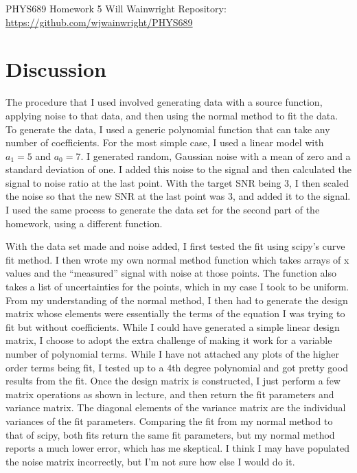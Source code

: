 \documentclass[twocolumn,11pt]{article}
\begin{document}
\pagestyle{plain}
\onecolumn
PHYS689 
\newline Homework 5
\newline Will Wainwright
\newline Repository: \href{https://github.com/wjwainwright/PHYS689}{https://github.com/wjwainwright/PHYS689}

\section*{Discussion}
The procedure that I used involved generating data with a source function, applying noise to that data, and then using the normal method to fit the data. To generate the data, I used a generic polynomial function that can take any number of coefficients. For the most simple case, I used a linear model with $a_1=5$ and $a_0=7$. I generated random, Gaussian noise with a mean of zero and a standard deviation of one. I added this noise to the signal and then calculated the signal to noise ratio at the last point. With the target SNR being 3, I then scaled the noise so that the new SNR at the last point was 3, and added it to the signal. I used the same process to generate the data set for the second part of the homework, using a different function.

With the data set made and noise added, I first tested the fit using scipy's curve fit method. I then wrote my own normal method function which takes arrays of x values and the ``measured'' signal with noise at those points. The function also takes a list of uncertainties for the points, which in my case I took to be uniform. From my understanding of the normal method, I then had to generate the design matrix whose elements were essentially the terms of the equation I was trying to fit but without coefficients. While I could have generated a simple linear design matrix, I choose to adopt the extra challenge of making it work for a variable number of polynomial terms. While I have not attached any plots of the higher order terms being fit, I tested up to a 4th degree polynomial and got pretty good results from the fit. Once the design matrix is constructed, I just perform a few matrix operations as shown in lecture, and then return the fit parameters and variance matrix. The diagonal elements of the variance matrix are the individual variances of the fit parameters. Comparing the fit from my normal method to that of scipy, both fits return the same fit parameters, but my normal method reports a much lower error, which has me skeptical. I think I may have populated the noise matrix incorrectly, but I'm not sure how else I would do it.
\end{document}
